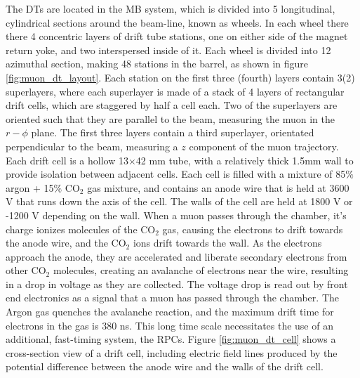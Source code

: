 \par The DTs are located in the MB system, which is divided into 5
longitudinal, cylindrical sections around the beam-line, known as
wheels.  In each wheel there there 4 concentric layers of drift tube
stations, one on either side of the magnet return yoke, and two
interspersed inside of it.  Each wheel is divided into 12 azimuthal
section, making 48 stations in the barrel, as shown in figure
\ref{fig:muon_dt_layout}.  Each station on the first three (fourth)
layers contain 3(2) superlayers, where each superlayer is made of a
stack of 4 layers of rectangular drift cells, which are staggered by
half a cell each.  Two of the superlayers are oriented such that they
are parallel to the beam, measuring the muon in the $r-\phi$ plane.
The first three layers contain a third superlayer, orientated
perpendicular to the beam, measuring a $z$ component of the muon
trajectory.  Each drift cell is a hollow 13$\times$42 mm tube, with a
relatively thick 1.5mm wall to provide isolation between adjacent
cells.  Each cell is filled with a mixture of 85$\%$ argon + 15$\%$
CO$_{2}$ gas mixture, and contains an anode wire that is held at 3600
V that runs down the axis of the cell.  The walls of the cell are held
at 1800 V or -1200 V depending on the wall.  When a muon passes
through the chamber, it's charge ionizes molecules of the CO$_{2}$
gas, causing the electrons to drift towards the anode wire, and the
CO$_{2}$ ions drift towards the wall.  As the electrons approach the
anode, they are accelerated and liberate secondary electrons from other
CO$_{2}$ molecules, creating an avalanche of electrons near the wire,
resulting in a drop in voltage as they are collected.  The voltage
drop is read out by front end electronics as a signal that a muon has
passed through the chamber.  The Argon gas quenches the avalanche
reaction, and the maximum drift time for electrons in the gas is 380
ns.  This long time scale necessitates the use of an additional,
fast-timing system, the RPCs.  Figure \ref{fig:muon_dt_cell} shows a
cross-section view of a drift cell, including electric field lines
produced by the potential difference between the anode wire and the
walls of the drift cell.   

